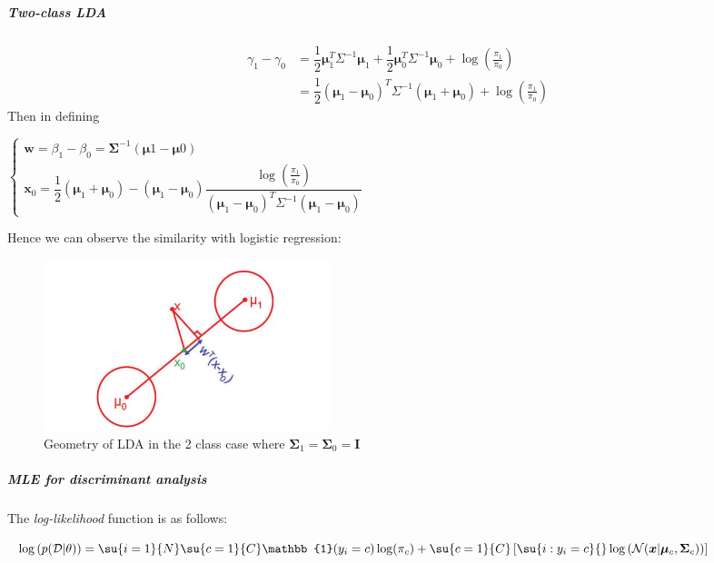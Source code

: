 \subparagraph{Two-class LDA}
\begin{align*}
    \gamma_{1} - \gamma_{0} 
    &= \dfrac{1}{2}\bm{\mu}_{1}^{T}\Sigma^{-1}\bm{\mu}_{1}+
    \dfrac{1}{2}\bm{\mu}_{0}^{T}\Sigma^{-1}\bm{\mu}_{0} +
    \log\left(\frac{\pi_{1}}{\pi_{0}}\right)\\
    &= \dfrac{1}{2}\left(\bm{\mu}_{1} - \bm{\mu}_{0}\right)^{T}\Sigma^{-1}
    \left(\bm{\mu}_{1} + \bm{\mu}_{0}\right) + \log\left(\frac{\pi_{1}}{\pi_{0}}\right)
\end{align*}
Then in defining 
\begin{center}
    $\begin{cases}
        \bm{w} = \beta_{1} - \beta_{0} = \bm{\Sigma}^{-1}\left(\bm{\mu}{1}-\bm{\mu}{0}
        \right)\\
        \bm{x}_{0} = \dfrac{1}{2}\left(\bm{\mu}_{1} + \bm{\mu}_{0}\right) - 
        \left(\bm{\mu}_{1} - \bm{\mu}_{0}\right)\dfrac{\log\left(\frac{\pi_{1}}{\pi_{0}}
        \right)}{\left(\bm{\mu}_{1} - \bm{\mu}_{0}\right)^{T}\Sigma^{-1}
    \left(\bm{\mu}_{1} - \bm{\mu}_{0}\right)}
    \end{cases}$
\end{center}
Hence we can observe the similarity with logistic regression:
\begin{center}
\end{center}
\begin{figure}[H]
    \begin{center}
        \includegraphics[width=.5\textwidth]{./chaps/32_sec/images/2_geometry_lda.png}
    \end{center}
    \caption{Geometry of LDA in the 2 class case where $\bm{\Sigma}_{1} = \bm{\Sigma}_{0}
= \bm{I}$}
    \label{fig:2_geometry_lda}
\end{figure}

\subparagraph{MLE for discriminant analysis}
The \emph{log-likelihood} function is as follows:
\begin{center}
    $\log\left(p(\mathcal{D}|\theta)\right) = 
    \su{i=1}{N}\su{c=1}{C}\mathbb{1}(y_{i}=c)\log(\pi_{c}) + \su{c=1}{C}\left[
        \su{i:y_{i}=c}{}\log\left(\mathcal{N}(\bm{x}|\bm{\mu}_{c},\bm{\Sigma}_{c})\right)
\right]$
\end{center}

